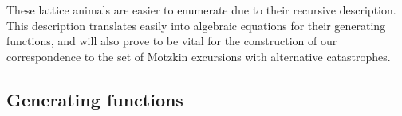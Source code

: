 These lattice animals are easier to enumerate due to their recursive description. This description translates easily into algebraic equations for their generating functions, and will also prove to be vital for the construction of our correspondence to the set of Motzkin excursions with alternative catastrophes.


\subsection{Generating functions}

